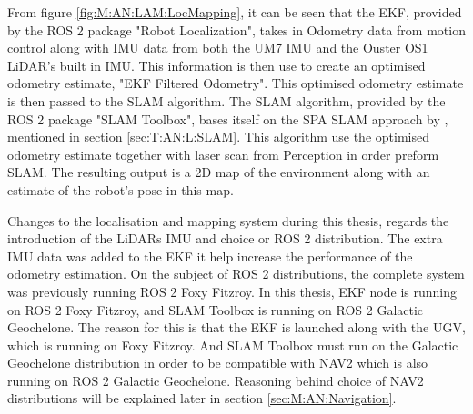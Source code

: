 From figure \ref{fig:M:AN:LAM:LocMapping}, it can be seen that the EKF, provided by the ROS 2 package "Robot Localization", takes in Odometry data from motion control along with IMU data from both the UM7 IMU and the Ouster OS1 LiDAR's built in IMU. This information is then use to create an optimised odometry estimate, "EKF Filtered Odometry". This optimised odometry estimate is then passed to the SLAM algorithm. The SLAM algorithm, provided by the ROS 2 package "SLAM Toolbox", bases itself on the SPA SLAM approach by \cite{Konolige2010}, mentioned in section \ref{sec:T:AN:L:SLAM}. This algorithm use the optimised odometry estimate together with laser scan from Perception in order preform SLAM. The resulting output is a 2D map of the environment along with an estimate of the robot's pose in this map.

Changes to the localisation and mapping system during this thesis, regards the introduction of the LiDARs IMU and choice or ROS 2 distribution. The extra IMU data was added to the EKF it help increase the performance of the odometry estimation. On the subject of ROS 2 distributions, the complete system was previously running ROS 2 Foxy Fitzroy. In this thesis, EKF node is running on ROS 2 Foxy Fitzroy, and SLAM Toolbox is running on ROS 2 Galactic Geochelone. The reason for this is that the EKF is launched along with the UGV, which is running on Foxy Fitzroy. And SLAM Toolbox must run on the Galactic Geochelone distribution in order to be compatible with NAV2 which is also running on ROS 2 Galactic Geochelone. Reasoning behind choice of NAV2 distributions will be explained later in section \ref{sec:M:AN:Navigation}.





